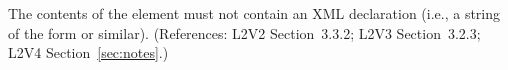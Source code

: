 The contents of the  element must not contain an XML
declaration (i.e., a string of the form  or similar).  (References: L2V2 Section~3.3.2;
L2V3 Section~3.2.3; L2V4 Section~\ref{sec:notes}.)
